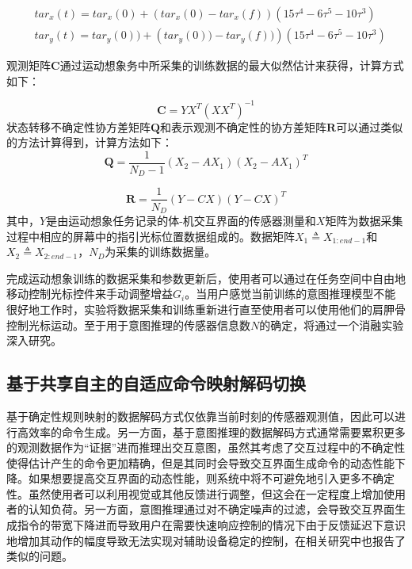 \begin{equation}
    \begin{aligned}
    & tar_x(t)=tar_x(0)+\left(tar_x(0)-tar_x(f)\right)\left(15 \tau^4-6 \tau^5-10 \tau^3\right) \\
    & tar_y(t)= tar_y(0))+\left(tar_y(0))- tar_y(f))\right)\left(15 \tau^4-6 \tau^5-10 \tau^3\right)
    \end{aligned}
    \label{eq3-9}
\end{equation}

观测矩阵${\mathbf{C}}$通过运动想象务中所采集的训练数据的最大似然估计来获得，计算方式如下：

\begin{equation}
    \mathbf{C} = YX^T(XX^T)^{-1}
\end{equation}
状态转移不确定性协方差矩阵${{\mathbf{Q}}}$和表示观测不确定性的协方差矩阵${{\mathbf{R}}}$可以通过类似的方法计算得到，计算方法如下：
\begin{equation}
{\mathbf{Q}} = \frac{1}{N_D-1}(X_2 - AX_1)(X_2 - AX_1)^T
\end{equation}

\begin{equation}
{\mathbf{R}} = \frac{1}{N_D}(Y - CX)(Y - CX)^T
\end{equation}
其中，$Y$是由运动想象任务记录的体-机交互界面的传感器测量和$X$矩阵为数据采集过程中相应的屏幕中的指引光标位置数据组成的。数据矩阵$X_1\triangleq X_{1:end-1}$和$X_2\triangleq X_{2:end-1}$，$N_D$为采集的训练数据量。

完成运动想象训练的数据采集和参数更新后，使用者可以通过在任务空间中自由地移动控制光标控件来手动调整增益${G_i}$。当用户感觉当前训练的意图推理模型不能很好地工作时，实验将数据采集和训练重新进行直至使用者可以使用他们的肩胛骨控制光标运动。至于用于意图推理的传感器信息数$N$的确定，将通过一个消融实验深入研究。  

\subsection{基于共享自主的自适应命令映射解码切换}  基于确定性规则映射的数据解码方式仅依靠当前时刻的传感器观测值，因此可以进行高效率的命令生成。另一方面，基于意图推理的数据解码方式通常需要累积更多的观测数据作为``证据''进而推理出交互意图，虽然其考虑了交互过程中的不确定性使得估计产生的命令更加精确，但是其同时会导致交互界面生成命令的动态性能下降。如果想要提高交互界面的动态性能，则系统中将不可避免地引入更多不确定性。虽然使用者可以利用视觉或其他反馈进行调整，但这会在一定程度上增加使用者的认知负荷。另一方面，意图推理通过对不确定噪声的过滤，会导致交互界面生成指令的带宽下降进而导致用户在需要快速响应控制的情况下由于反馈延迟下意识地增加其动作的幅度导致无法实现对辅助设备稳定的控制，在相关研究\cite{seanez-gonzalezStaticDynamicDecoding2017}中也报告了类似的问题。

